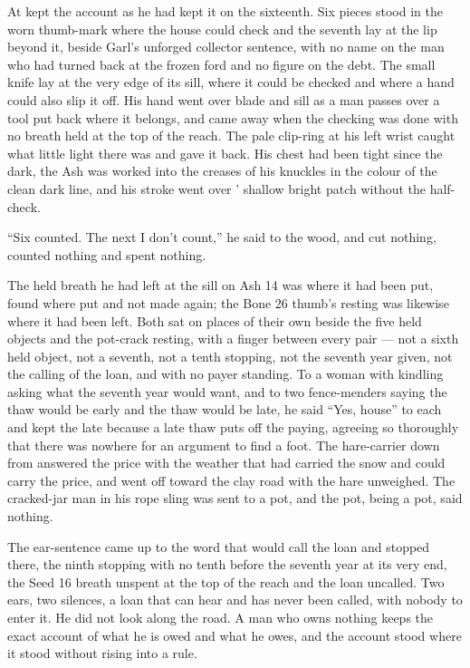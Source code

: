 \scenebreak

At   kept the account as he had kept it on the sixteenth. Six pieces stood in the worn thumb-mark where the house could check and the seventh lay at the lip beyond it, beside Garl's unforged collector sentence, with no name on the man who had turned back at the frozen ford and no figure on the debt. The small knife lay at the very edge of its sill, where it could be checked and where a hand could also slip it off. His hand went over blade and sill as a man passes over a tool put back where it belongs, and came away when the checking was done with no breath held at the top of the reach. The pale clip-ring at his left wrist caught what little light there was and gave it back. His chest had been tight since the dark, the Ash was worked into the creases of his knuckles in the colour of the clean dark line, and his stroke went over ' shallow bright patch without the half-check.

“Six counted. The next I don't count,” he said to the wood, and cut nothing, counted nothing and spent nothing.

The held breath he had left at the sill on Ash 14 was where it had been put, found where put and not made again; the Bone 26 thumb's resting was likewise where it had been left. Both sat on places of their own beside the five held objects and the pot-crack resting, with a finger between every pair — not a sixth held object, not a seventh, not a tenth stopping, not the seventh year given, not the calling of the loan, and with no payer standing. To a woman with kindling asking what the seventh year would want, and to two fence-menders saying the thaw would be early and the thaw would be late, he said “Yes, house” to each and kept the late because a late thaw puts off the paying, agreeing so thoroughly that there was nowhere for an argument to find a foot. The hare-carrier down from  answered the price with the weather that had carried the snow and could carry the price, and went off toward the clay road with the hare unweighed. The cracked-jar man in his rope sling was sent to a pot, and the pot, being a pot, said nothing.

The ear-sentence came up to the word that would call the loan and stopped there, the ninth stopping with no tenth before the seventh year at its very end, the Seed 16 breath unspent at the top of the reach and the loan uncalled. Two ears, two silences, a loan that can hear and has never been called, with nobody to enter it. He did not look along the road. A man who owns nothing keeps the exact account of what he is owed and what he owes, and the account stood where it stood without rising into a rule.

